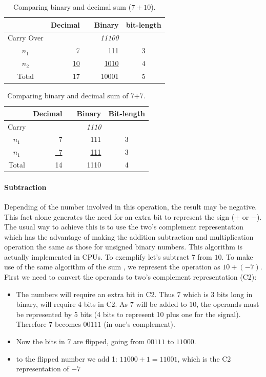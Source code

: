 \documentclass[10pt]{article}
\begin{document}
\begin{table}[ht]
	\centering
    \caption{Comparing binary and decimal sum ($7+10$).}
    \begin{tabular}{crrrc}
    \hline
    	  & Decimal & & Binary & bit-length \\
    \hline      
    Carry Over& 	& & \textit{11100} & \\
    $n_1$ & 7   & & 111 & 3 \\
    $n_2$ & \underline{10}	& & \underline{1010} & 4 \\
    Total & 17	& & 10001 & 5 \\
    \hline
	\end{tabular}
    \label{tab:01}
\end{table}
\begin{table}[ht]
    \centering
    \caption{Comparing binary and decimal sum of 7+7.}
    \begin{tabular}{crrrc}
    \hline
    	  & Decimal & & Binary & Bit-length \\
    \hline      
    Carry & 	& & \textit{1110} & \\
    $n_1$ & 7   & & 111 & 3 \\
    $n_1$ & \underline{~7}	& & \underline{111} & 3 \\
    Total & 14	& & 1110 & 4 \\
    \hline
	\end{tabular}
    \label{tab:02}
\end{table}

\paragraph{Subtraction}

Depending of the number involved in this operation, the result may be negative.
This fact alone generates the need for an extra bit to represent the sign ($+$
or $-$). The usual way to achieve this is to use the  two's complement
\cite{flores1963logic} representation which has the advantage of making the
addition subtraction and multiplication operation the same as those for unsigned
binary numbers. This algorithm is actually implemented in 
CPUs. To exemplify let's subtract $7$ from $10$. To make use of the
same algorithm of the sum , we represent the operation as $10+(-7)$. First we
need to convert the operands to two's complement representation (C2):

\begin{itemize}
    \item The numbers will require an extra bit in C2. Thus 7 which is 3
bits long in binary, will require 4 bits in C2. As $7$ will be added to $10$,
the operands must be represented by 5 bits (4 bits to represent 10 plus one for
the signal). Therefore $7$ becomes $00111$ (in one's complement).

    \item Now the bits in 7 are flipped, going from $00111$ to $11000$.

    \item to the flipped number we add 1: $11000+1=11001$, which is the C2
representation of $-7$
\end{itemize}
\end{document}
